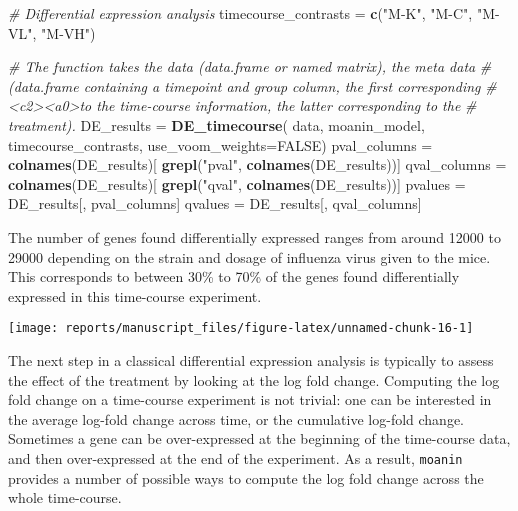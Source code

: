 \documentclass[9pt,a4paper,]{extarticle}
\newenvironment{Shaded}{\begin{snugshade}}{\end{snugshade}}
\newcommand{\CommentTok}[1]{\textcolor[rgb]{0.56,0.35,0.01}{\textit{#1}}}
\newcommand{\DataTypeTok}[1]{\textcolor[rgb]{0.13,0.29,0.53}{#1}}
\newcommand{\KeywordTok}[1]{\textcolor[rgb]{0.13,0.29,0.53}{\textbf{#1}}}
\newcommand{\NormalTok}[1]{#1}
\newcommand{\OtherTok}[1]{\textcolor[rgb]{0.56,0.35,0.01}{#1}}
\newcommand{\StringTok}[1]{\textcolor[rgb]{0.31,0.60,0.02}{#1}}
\begin{document}
\begin{Shaded}
\begin{Highlighting}[]
\CommentTok{# Differential expression analysis}
\NormalTok{timecourse_contrasts =}\StringTok{ }\KeywordTok{c}\NormalTok{(}\StringTok{"M-K"}\NormalTok{, }\StringTok{"M-C"}\NormalTok{, }\StringTok{"M-VL"}\NormalTok{, }\StringTok{"M-VH"}\NormalTok{)}

\CommentTok{# The function takes the data (data.frame or named matrix), the meta data}
\CommentTok{# (data.frame containing a timepoint and group column, the first corresponding}
\CommentTok{#<c2><a0>to the time-course information, the latter corresponding to the}
\CommentTok{# treatment).}
\NormalTok{DE_results =}\StringTok{ }\KeywordTok{DE_timecourse}\NormalTok{(}
\NormalTok{    data, moanin_model, timecourse_contrasts,}
    \DataTypeTok{use_voom_weights=}\OtherTok{FALSE}\NormalTok{)}
\NormalTok{pval_columns =}\StringTok{ }\KeywordTok{colnames}\NormalTok{(DE_results)[}
    \KeywordTok{grepl}\NormalTok{(}\StringTok{"pval"}\NormalTok{, }\KeywordTok{colnames}\NormalTok{(DE_results))]}
\NormalTok{qval_columns =}\StringTok{ }\KeywordTok{colnames}\NormalTok{(DE_results)[}
    \KeywordTok{grepl}\NormalTok{(}\StringTok{"qval"}\NormalTok{, }\KeywordTok{colnames}\NormalTok{(DE_results))]}
\NormalTok{pvalues =}\StringTok{ }\NormalTok{DE_results[, pval_columns]}
\NormalTok{qvalues =}\StringTok{ }\NormalTok{DE_results[, qval_columns]}
\end{Highlighting}
\end{Shaded}

The number of genes found differentially expressed ranges from around 12000 to
29000 depending on the strain and dosage of influenza virus given to the mice.
This corresponds to between 30\% to 70\% of the genes found differentially
expressed in this time-course experiment.

\begin{center}\texttt{[image: reports/manuscript\_files/figure-latex/unnamed-chunk-16-1]} \end{center}

The next step in a classical differential expression analysis is typically to
assess the effect of the treatment by looking at the log fold change.
Computing the log fold change on a time-course experiment is not trivial: one
can be interested in the average log-fold change across time, or the
cumulative log-fold change. Sometimes a gene can be over-expressed at the
beginning of the time-course data, and then over-expressed at the end of the
experiment. As a result, \texttt{moanin} provides a number of possible ways to
compute the log fold change across the whole time-course.
\end{document}
